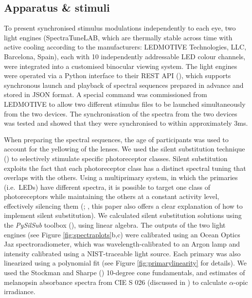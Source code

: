 \documentclass[
]{article}
\begin{document}
\subsection{Apparatus \& stimuli}\label{apparatus-stimuli}

To present synchronised stimulus modulations independently to each eye, two light engines (SpectraTuneLAB, which are thermally stable across time with active cooling according to the manufacturers: LEDMOTIVE Technologies, LLC, Barcelona, Spain), each with 10 independently addressable LED colour channels, were integrated into a customised binocular viewing system. The light engines were operated via a Python interface to their REST API (), which supports synchronous launch and playback of spectral sequences prepared in advance and stored in JSON format. A special command was commissioned from LEDMOTIVE to allow two different stimulus files to be launched simultaneously from the two devices. The synchronisation of the spectra from the two devices was tested and showed that they were synchronised to within approximately 3ms.

When preparing the spectral sequences, the age of participants was used to account for the yellowing of the lenses. We used the silent substitution technique () to selectively stimulate specific photoreceptor classes. Silent substitution exploits the fact that each photoreceptor class has a distinct spectral tuning that overlaps with the others. Using a multiprimary system, in which the primaries (i.e.~LEDs) have different spectra, it is possible to target one class of photoreceptors while maintaining the others at a constant activity level, effectively silencing them (; , this paper also offers a clear explanation of how to implement silent substitution). We calculated silent substitution solutions using the \emph{PySilSub} toolbox (), using linear algebra. The outputs of the two light engines (see Figure \ref{fig:spectraplots}b,c) were calibrated using an Ocean Optics Jaz spectroradiometer, which was wavelength-calibrated to an Argon lamp and intensity calibrated using a NIST-traceable light source. Each primary was also linearized using a polynomial fit (see Figure \ref{fig:primarylinearity} for details). We used the Stockman and Sharpe () 10-degree cone fundamentals, and estimates of melanopsin absorbance spectra from CIE S 026 (discussed in ) to calculate \(\alpha\)-opic irradiance.
\end{document}
